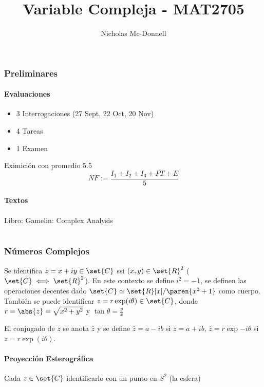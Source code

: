 \documentclass{notetaking}
\title{Variable Compleja - MAT2705}
\author{Nicholas Mc-Donnell}
\date{}
\begin{document}
\maketitle
\tableofcontents
\newpage

\section*{Preliminares}

\subsection*{Evaluaciones}
\begin{itemize}
    \item 3 Interrogaciones (27 Sept, 22 Oct, 20 Nov)
    \item 4 Tareas
    \item 1 Examen
\end{itemize}
Eximición con promedio 5.5
\[
    NF:=\frac{I_1+I_2+I_3+PT+E}5
\]

\subsection*{Textos}
Libro: Gamelin: Complex Analysis

\part{}
\section{Números Complejos}
Se identifica \(z=x+iy\in\set{C}\) ssi \((x,y)\in\set{R}^2\) (\(\set{C}\iff\set{R}^2\)). En este contexto se define \(i^2=-1\), se definen las operaciones decentes dado \(\set{C}\simeq\set{R}[x]/\paren{x^2+1}\) como cuerpo.\\
También se puede identificar \(z=r\exp(i\theta)\in\set{C}\), donde \(r=\abs{z}=\sqrt{x^2+y^2}\) y \(\tan\theta=\frac{y}{x}\)

\begin{defn}[Conjugado]
    El conjugado de \(z\) se anota \(\bar{z}\) y se define \(\bar{z}=a-ib\) si \(z=a+ib\), \(\bar{z}=r\exp{-i\theta}\) si \(z=r\exp(i\theta)\).
\end{defn}

\subsection{Proyección Esterográfica}
\begin{defn}
    Cada \(z\in\set{C}\) identificarlo con un punto en \(S^2\) (la esfera)
\end{defn}
\end{document}
